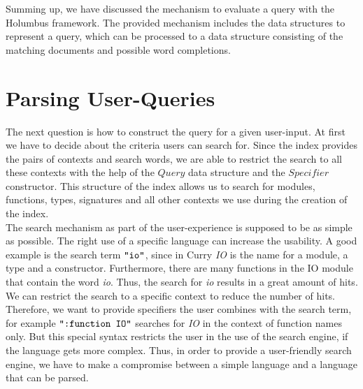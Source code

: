 \documentclass[%
	latex,%
	a4paper,%
	oneside,%
	chapterprefix,%
	headsepline,%
	12pt%
]{scrbook}
\newcommand{\Conid}[1]{\mathit{#1}}
\begin{document}



Summing up, we have discussed the mechanism to evaluate a query with
the Holumbus framework. %
The provided mechanism includes the data structures to represent a
query, which can be processed to a data structure consisting of the
matching documents and possible word completions. %

\section{Parsing User-Queries}\label{analysis:parser}
The next question is how to construct the query for a given
user-input. %
At first we have to decide about the criteria users can search for. %
Since the index provides the pairs of contexts and search words, we
are able to restrict the search to all these contexts with the help of
the \ensuremath{\Conid{Query}} data structure and the \ensuremath{\Conid{Specifier}} constructor. %
This structure of the index allows us to search for modules,
functions, types, signatures and all other contexts we use during the
creation of the index.\\

The search mechanism as part of the user-experience is supposed to be
as simple as possible. %
The right use of a specific language can increase the usability. %
A good example is the search term \ensuremath{\text{\tt \char34 io\char34}}, since in Curry \emph{IO}
is the name for a module, a type and a constructor. %
Furthermore, there are many functions in the IO module that contain
the word \emph{io}. Thus, the search for \emph{io} results in a great
amount of hits. %
We can restrict the search to a specific context to reduce the number
of hits. %
Therefore, we want to provide specifiers the user combines with the
search term, for example \ensuremath{\text{\tt \char34 :function~IO\char34}} searches for \emph{IO} in
the context of function names only. %
But this special syntax restricts the user in the use of the search
engine, if the language gets more complex. %
Thus, in order to provide a user-friendly search engine, we have to make a
compromise between a simple language and a language that can be
parsed. %
\end{document}

